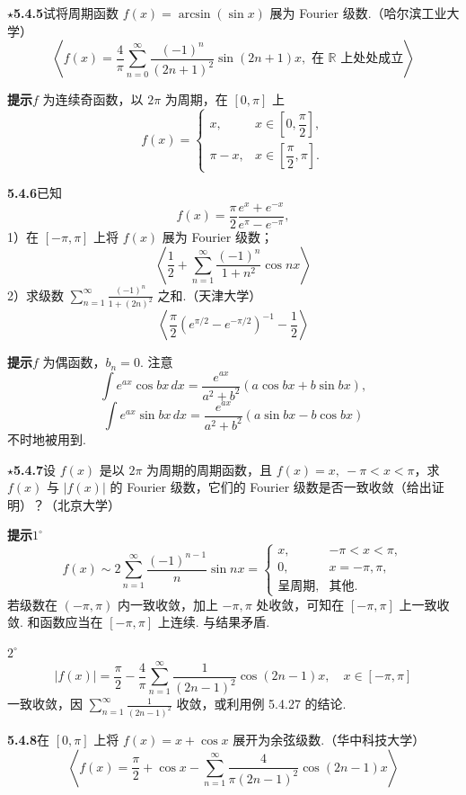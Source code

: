 \documentclass[UTF8,12pt,a4paper,fontset=fandol]{ctexart}
\begin{document}
\noindent\(\star\)\textbf{5.4.5}\quad 试将周期函数 $f(x)=\arcsin(\sin x)$ 展为 Fourier 级数.（哈尔滨工业大学）
\[
  \left\langle
  f(x)=\frac4\pi\sum_{n=0}^{\infty}\frac{(-1)^n}{(2n+1)^2}\sin(2n+1)x,
  \text{ 在 }\mathbb R\text{ 上处处成立}
  \right\rangle
\]

\noindent\textbf{提示}\quad $f$ 为连续奇函数，以 $2\pi$ 为周期，在 $[0,\pi]$ 上
\[
  f(x)=
  \begin{cases}
  x,&x\in\left[0,\dfrac{\pi}{2}\right],\\
  \pi-x,&x\in\left[\dfrac{\pi}{2},\pi\right].
  \end{cases}
\]

\noindent\textbf{5.4.6}\quad 已知
\[
  f(x)=\frac{\pi}{2}\frac{e^x+e^{-x}}{e^{\pi}-e^{-\pi}},
\]
1）在 $[-\pi,\pi]$ 上将 $f(x)$ 展为 Fourier 级数；
\[
  \left\langle \frac12+\sum_{n=1}^{\infty}\frac{(-1)^n}{1+n^2}\cos nx\right\rangle
\]
2）求级数 $\displaystyle\sum_{n=1}^{\infty}\frac{(-1)^n}{1+(2n)^2}$ 之和.（天津大学）
\[
  \left\langle \frac{\pi}{2}\left(e^{\pi/2}-e^{-\pi/2}\right)^{-1}-\frac12\right\rangle
\]

\noindent\textbf{提示}\quad $f$ 为偶函数，$b_n=0$. 注意
\[
  \int e^{ax}\cos bx\,dx=\frac{e^{ax}}{a^2+b^2}(a\cos bx+b\sin bx),
\]
\[
  \int e^{ax}\sin bx\,dx=\frac{e^{ax}}{a^2+b^2}(a\sin bx-b\cos bx)
\]
不时地被用到.

\noindent\(\star\)\textbf{5.4.7}\quad 设 $f(x)$ 是以 $2\pi$ 为周期的周期函数，且 $f(x)=x,\ -\pi<x<\pi$，求 $f(x)$ 与
$|f(x)|$ 的 Fourier 级数，它们的 Fourier 级数是否一致收敛（给出证明）？（北京大学）

\noindent\textbf{提示}\quad $1^\circ$\quad
\[
  f(x)\sim2\sum_{n=1}^{\infty}\frac{(-1)^{n-1}}{n}\sin nx
  =
  \begin{cases}
  x,&-\pi<x<\pi,\\
  0,&x=-\pi,\pi,\\
  \text{呈周期},&\text{其他}.
  \end{cases}
\]
若级数在 $(-\pi,\pi)$ 内一致收敛，加上 $-\pi,\pi$ 处收敛，可知在 $[-\pi,\pi]$ 上一致收敛. 和函数应当在
$[-\pi,\pi]$ 上连续. 与结果矛盾.

$2^\circ$\quad
\[
  |f(x)|=\frac{\pi}{2}-\frac4\pi\sum_{n=1}^{\infty}
  \frac1{(2n-1)^2}\cos(2n-1)x,\quad x\in[-\pi,\pi]
\]
一致收敛，因 $\displaystyle\sum_{n=1}^{\infty}\frac1{(2n-1)^2}$ 收敛，或利用例 5.4.27 的结论.

\noindent\textbf{5.4.8}\quad 在 $[0,\pi]$ 上将 $f(x)=x+\cos x$ 展开为余弦级数.（华中科技大学）
\[
  \left\langle f(x)=\frac{\pi}{2}+\cos x-\sum_{n=1}^{\infty}
  \frac4{\pi(2n-1)^2}\cos(2n-1)x\right\rangle
\]
\end{document}
